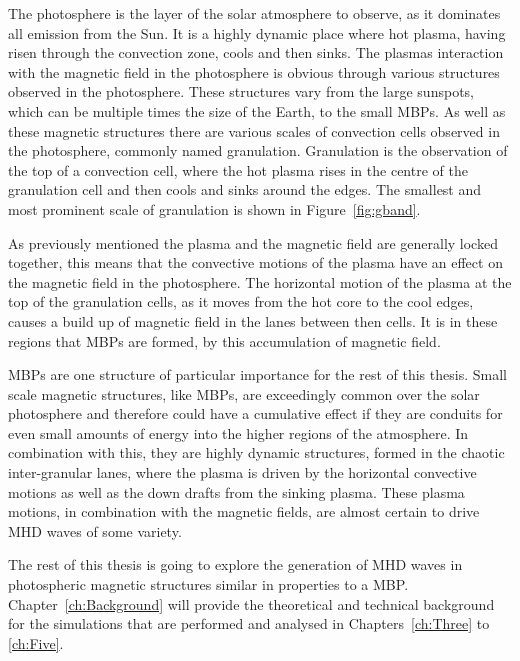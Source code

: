 The photosphere is the layer of the solar atmosphere to observe, as it dominates all emission from the Sun.
It is a highly dynamic place where hot plasma, having risen through the convection zone, cools and then sinks.
The plasmas interaction with the magnetic field in the photosphere is obvious through various structures observed in the photosphere.
These structures vary from the large sunspots, which can be multiple times the size of the Earth, to the small MBPs.
As well as these magnetic structures there are various scales of convection cells observed in the photosphere, commonly named granulation.
Granulation is the observation of the top of a convection cell, where the hot plasma rises in the centre of the granulation cell and then cools and sinks around the edges.
The smallest and most prominent scale of granulation is shown in Figure~\ref{fig:gband}.

As previously mentioned the plasma and the magnetic field are generally locked together, this means that the convective motions of the plasma have an effect on the magnetic field in the photosphere.
The horizontal motion of the plasma at the top of the granulation cells, as it moves from the hot core to the cool edges, causes a build up of magnetic field in the lanes between then cells.
It is in these regions that MBPs are formed, by this accumulation of magnetic field.

MBPs are one structure of particular importance for the rest of this thesis.
Small scale magnetic structures, like MBPs, are exceedingly common over the solar photosphere and therefore could have a cumulative effect if they are conduits for even small amounts of energy into the higher regions of the atmosphere.
In combination with this, they are highly dynamic structures, formed in the chaotic inter-granular lanes, where the plasma is driven by the horizontal convective motions as well as the down drafts from the sinking plasma.
These plasma motions, in combination with the magnetic fields, are almost certain to drive MHD waves of some variety. 

The rest of this thesis is going to explore the generation of MHD waves in photospheric magnetic structures similar in properties to a MBP.
Chapter~\ref{ch:Background} will provide the theoretical and technical background for the simulations that are performed and analysed in Chapters~\ref{ch:Three} to \ref{ch:Five}.
